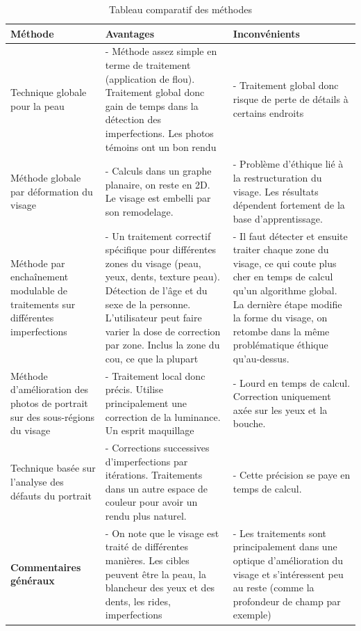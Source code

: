 \documentclass[11pt, french,screen]{report-rd-info}
\begin{document}
\begin{table}
\begin{center}
\begin{tabular}{|p{3cm}|p{6.5cm}|p{6.5cm}|}
\hline
\textbf{Méthode} & \textbf{Avantages} & \textbf{Inconvénients} \\ \hline
Technique globale pour la peau & - Méthode assez simple en terme de traitement (application de flou). Traitement global donc gain de temps dans la détection des imperfections. Les photos témoins ont un bon rendu & - Traitement global donc risque de perte de détails à certains endroits \\ \hline
Méthode globale par déformation du visage & - Calculs dans un graphe planaire, on reste en 2D. Le visage est embelli par son remodelage. & - Problème d'éthique lié à la restructuration du visage. Les résultats dépendent fortement de la base d'apprentissage. \\ \hline
Méthode par enchaînement modulable de traitements sur différentes imperfections & - Un traitement correctif spécifique pour différentes zones du visage (peau, yeux, dents, texture peau). Détection de l'âge et du sexe de la personne. L'utilisateur peut faire varier la dose de correction par zone. Inclus la zone du cou, ce que la plupart  & - Il faut détecter et ensuite traiter chaque zone du visage, ce qui coute plus cher en temps de calcul qu'un algorithme global. La dernière étape modifie la forme du visage, on retombe dans la même problématique éthique qu'au-dessus. \\ \hline
Méthode d’amélioration des photos de portrait sur des sous-régions du visage & - Traitement local donc précis. Utilise principalement une correction de la luminance. Un esprit maquillage & - Lourd en temps de calcul. Correction uniquement axée sur les yeux et la bouche. \\ \hline
Technique basée sur l’analyse des défauts du portrait & - Corrections successives d'imperfections par itérations. Traitements dans un autre espace de couleur pour avoir un rendu plus naturel. & - Cette précision se paye en temps de calcul. \\ \hline
\textbf{Commentaires généraux} & - On note que le visage est traité de différentes manières. Les cibles peuvent être la peau, la blancheur des yeux et des dents, les rides, imperfections & - Les traitements sont principalement dans une optique d'amélioration du visage et s'intéressent peu au reste (comme la profondeur de champ par exemple) \\ \hline
\end{tabular}
\end{center}
\caption{Tableau comparatif des méthodes}
\label{tab:ComparaisonMéthodes}
\end{table}
\end{document}
